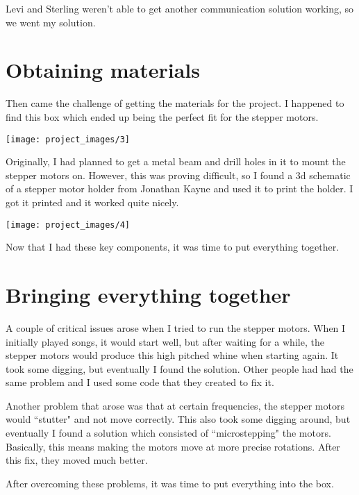 \documentclass[12pt,letterpaper]{article}
\begin{document}
	Levi and Sterling weren't able to get another communication solution working, so we went my solution. 
	
	\section{Obtaining materials}
	
	Then came the challenge of getting the materials for the project. I happened to find this box which ended up being the perfect fit for the stepper motors. 
	
	\begin{center}
		\texttt{[image: project\_images/3]}
	\end{center}

	Originally, I had planned to get a metal beam and drill holes in it to mount the stepper motors on. However, this was proving difficult, so I found a 3d schematic of a stepper motor holder from Jonathan Kayne and used it to print the holder. I got it printed and it worked quite nicely. 
	
	\begin{center}
		\texttt{[image: project\_images/4]}
	\end{center}

	Now that I had these key components, it was time to put everything together. 
	
	\section{Bringing everything together}
	
	A couple of critical issues arose when I tried to run the stepper motors. When I initially played songs, it would start well, but after waiting for a while, the stepper motors would produce this high pitched whine when starting again. It took some digging, but eventually I found the solution. Other people had had the same problem and I used some code that they created to fix it. 
	
	Another problem that arose was that at certain frequencies, the stepper motors would ``stutter" and not move correctly. This also took some digging around, but eventually I found a solution which consisted of ``microstepping" the motors. Basically, this means making the motors move at more precise rotations. After this fix, they moved much better. 
	
	After overcoming these problems, it was time to put everything into the box. 
	
\end{document}

